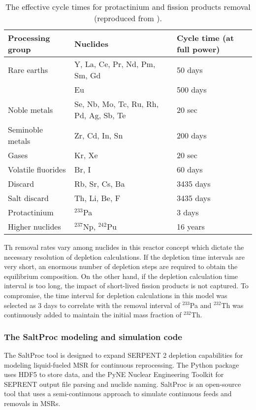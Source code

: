 \begin{table}[ht!]
        \centering
        \caption{The effective cycle times for protactinium and fission 
        products removal (reproduced from \cite{robertson_conceptual_1971}).}
        \begin{tabularx}{\textwidth}{ x | s | x }
        \hline Processing group & \qquad\qquad\qquad Nuclides & Cycle time (at 
                full power) \\ \hline Rare earths & Y, La, Ce, Pr, Nd, Pm, Sm, 
                Gd & 50 days \\ \qquad & Eu & 500 days \\ Noble metals & Se, 
                Nb, Mo, Tc, Ru, Rh, Pd, Ag, Sb, Te & 20 sec \\
        Seminoble metals & Zr, Cd, In, Sn & 200 days \\
        Gases & Kr, Xe & 20 sec \\ Volatile fluorides & Br, I & 60 days \\
        Discard & Rb, Sr, Cs, Ba & 3435 days \\ Salt discard & Th, Li, Be, F & 
                3435 days \\ Protactinium & $^{233}$Pa & 3 days \\ Higher 
                nuclides & $^{237}$Np, $^{242}$Pu & 16 years \\  \hline
        \end{tabularx}
        \label{tab:reprocessing_list}
\end{table}
Th removal rates vary among nuclides in this reactor concept which dictate the 
necessary resolution of depletion calculations. If the depletion time intervals 
are very short, an enormous number of depletion steps are required to obtain 
the equilibrium composition. On the other hand, if the depletion  calculation 
time interval is too long, the impact of short-lived fission products is not 
captured. To compromise, the time interval for depletion calculations in this 
model was selected as 3 days to correlate with the removal interval of 
$^{233}$Pa and $^{232}$Th was continuously added to maintain the initial mass 
fraction of $^{232}$Th.

\subsubsection{The SaltProc modeling and simulation code}
The SaltProc tool \cite{andrei_rykhlevskii_arfc/saltproc:_2018} is designed to 
expand SERPENT 2
 depletion capabilities for modeling liquid-fueled \gls{MSR} for continuous 
 reprocessing.
The Python package uses HDF5 \cite{the_hdf_group_hierarchical_1997} to store 
data, and the PyNE Nuclear Engineering Toolkit \cite{scopatz_pyne:_2012}
for SEPRENT output file parsing and nuclide naming. SaltProc is an open-source tool 
that uses a semi-continuous approach to simulate continuous feeds and removals 
in \glspl{MSR}. 

